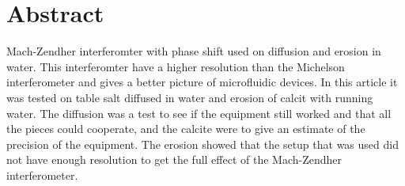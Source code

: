 \section {Abstract}
  Mach-Zendher interferomter with phase shift used on diffusion and erosion in
  water. This interferomter have a higher resolution than the Michelson interferometer
  and gives a better picture of microfluidic devices. In this article it was tested
  on table salt diffused in water and erosion of calcit with running water.
  The diffusion was a test to see if the equipment still worked and that all the
  pieces could cooperate, and the calcite were to give an estimate of the precision
  of the equipment. The erosion showed that the setup that was used did not have 
  enough resolution to get the full effect of the Mach-Zendher interferometer.
